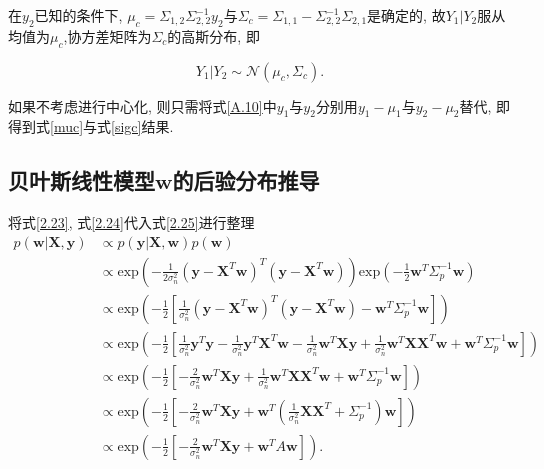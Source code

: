 \begin{pf}
            在$y_{2}$已知的条件下, $\mu_{c}=\Sigma_{1,2}\Sigma^{-1}_{2,2}y_{2}$与$\Sigma_{c}=\Sigma_{1,1}-\Sigma^{-1}_{2,2}\Sigma_{2,1}$是确定的, 故$Y_{1}|Y_{2}$服从均值为$\mu_{c}$,协方差矩阵为$\Sigma_{c}$的高斯分布, 即

            $$Y_{1}|Y_{2}\sim\mathcal{N}(\mu_{c},\Sigma_{c}).$$

            如果不考虑进行中心化, 则只需将式\ref{A.10}中$y_{1}$与$y_{2}$分别用$y_{1}-\mu_{1}$与$y_{2}-\mu_{2}$替代, 即得到式\ref{muc}与式\ref{sigc}结果.

        \end{pf}

    \subsection{贝叶斯线性模型$\boldsymbol{w}$的后验分布推导} \label{A.3}

        将式\ref{2.23}, 式\ref{2.24}代入式\ref{2.25}进行整理
        \begin{equation}\label{A3.11}
        \begin{aligned}
            p(\boldsymbol{w}|\boldsymbol{X},\boldsymbol{y})
            &\propto p(\boldsymbol{y}|\boldsymbol{X},\boldsymbol{w})p(\boldsymbol{w}) \\
            &\propto \mathrm{exp}\left(-\frac{1}{2\sigma^{2}_{n}}(\boldsymbol{y}-\boldsymbol{X}^{T}\boldsymbol{w})^{T}(\boldsymbol{y}-\boldsymbol{X}^{T}\boldsymbol{w})\right) \mathrm{exp}\left(-\frac{1}{2}\boldsymbol{w}^{T}\Sigma^{-1}_{p}\boldsymbol{w} \right) \\
            &\propto \mathrm{exp}\left(-\frac{1}{2}\left[\frac{1}{\sigma^{2}_{n}}(\boldsymbol{y}-\boldsymbol{X}^{T}\boldsymbol{w})^{T}(\boldsymbol{y}-\boldsymbol{X}^{T}\boldsymbol{w})-\boldsymbol{w}^{T}\Sigma^{-1}_{p}\boldsymbol{w}\right] \right) \\
            &\propto \mathrm{exp}\left(-\frac{1}{2}\left[ \frac{1}{\sigma^{2}_{n}}\boldsymbol{y}^{T}\boldsymbol{y} - \frac{1}{\sigma^{2}_{n}}\boldsymbol{y}^{T}\boldsymbol{X}^{T}\boldsymbol{w} - \frac{1}{\sigma^{2}_{n}}\boldsymbol{w}^{T}\boldsymbol{Xy} + \frac{1}{\sigma^{2}_{n}}\boldsymbol{w}^{T}\boldsymbol{X}\boldsymbol{X}^{T}\boldsymbol{w} + \boldsymbol{w}^{T}\Sigma^{-1}_{p}\boldsymbol{w} \right] \right) \\
            &\propto \mathrm{exp}\left(-\frac{1}{2}\left[- \frac{2}{\sigma^{2}_{n}}\boldsymbol{w}^{T}\boldsymbol{Xy} + \frac{1}{\sigma^{2}_{n}}\boldsymbol{w}^{T}\boldsymbol{X}\boldsymbol{X}^{T}\boldsymbol{w} + \boldsymbol{w}^{T}\Sigma^{-1}_{p}\boldsymbol{w} \right] \right) \\
            &\propto \mathrm{exp}\left(-\frac{1}{2}\left[ -\frac{2}{\sigma^{2}_{n}}\boldsymbol{w}^{T}\boldsymbol{Xy} + \boldsymbol{w}^{T}(\frac{1}{\sigma^{2}_{n}}\boldsymbol{X}\boldsymbol{X}^{T} + \Sigma^{-1}_{p})\boldsymbol{w} \right] \right) \\
            &\propto \mathrm{exp}\left(-\frac{1}{2}\left[ -\frac{2}{\sigma^{2}_{n}}\boldsymbol{w}^{T}\boldsymbol{Xy} + \boldsymbol{w}^{T}A\boldsymbol{w} \right] \right).
        \end{aligned}
        \end{equation}

